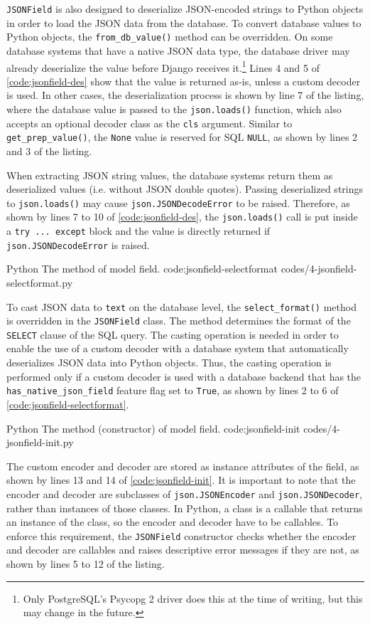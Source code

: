 \verb|JSONField| is also designed to deserialize JSON-encoded strings to Python
objects in order to load the JSON data from the database. To convert database
values to Python objects, the \verb|from_db_value()| method can be overridden.
On some database systems that have a native JSON data type, the database driver
may already deserialize the value before Django receives it.\footnote{Only
PostgreSQL's Psycopg 2 driver does this at the time of writing, but this may
change in the future.} Lines 4 and 5 of \autoref{code:jsonfield-des} show that
the value is returned as-is, unless a custom decoder is used. In other cases,
the deserialization process is shown by line 7 of the listing, where
the database value is passed to the \verb|json.loads()| function, which also
accepts an optional decoder class as the \verb|cls| argument. Similar to
\verb|get_prep_value()|, the \verb|None| value is reserved for SQL \verb|NULL|,
as shown by lines 2 and 3 of the listing.

When extracting JSON string values, the database systems return them as
deserialized values (i.e. without JSON double quotes). Passing deserialized
strings to \verb|json.loads()| may cause \verb|json.JSONDecodeError| to be
raised. Therefore, as shown by lines 7 to 10 of \autoref{code:jsonfield-des},
the \verb|json.loads()| call is put inside a \verb|try ... except| block and
the value is directly returned if \verb|json.JSONDecodeError| is raised.

\listing
{Python}
{The  method of  model field.}
{code:jsonfield-selectformat}
{codes/4-jsonfield-selectformat.py}

To cast JSON data to \verb|text| on the database level, the
\verb|select_format()| method is overridden in the \verb|JSONField| class. The
method determines the format of the \verb|SELECT| clause of the SQL query. The
casting operation is needed in order to enable the use of a custom decoder with
a database system that automatically deserializes JSON data into Python
objects. Thus, the casting operation is performed only if a custom decoder is
used with a database backend that has the \verb|has_native_json_field| feature
flag set to \verb|True|, as shown by lines 2 to 6 of
\autoref{code:jsonfield-selectformat}.

\listing
{Python}
{The  method (constructor) of 
model field.}
{code:jsonfield-init}
{codes/4-jsonfield-init.py}

The custom encoder and decoder are stored as instance attributes of the field,
as shown by lines 13 and 14 of \autoref{code:jsonfield-init}. It is important
to note that the encoder and decoder are subclasses of \verb|json.JSONEncoder|
and \verb|json.JSONDecoder|, rather than instances of those classes. In Python,
a class is a callable that returns an instance of the class, so the encoder and
decoder have to be callables. To enforce this requirement, the \verb|JSONField|
constructor checks whether the encoder and decoder are callables and raises
descriptive error messages if they are not, as shown by lines 5 to 12 of the
listing.

